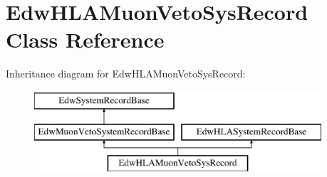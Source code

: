 \hypertarget{class_edw_h_l_a_muon_veto_sys_record}{
\section{EdwHLAMuonVetoSysRecord Class Reference}
\label{class_edw_h_l_a_muon_veto_sys_record}
}
Inheritance diagram for EdwHLAMuonVetoSysRecord:\begin{figure}[H]
\begin{center}
\leavevmode
\includegraphics[height=3cm]{class_edw_h_l_a_muon_veto_sys_record}
\end{center}
\end{figure}
